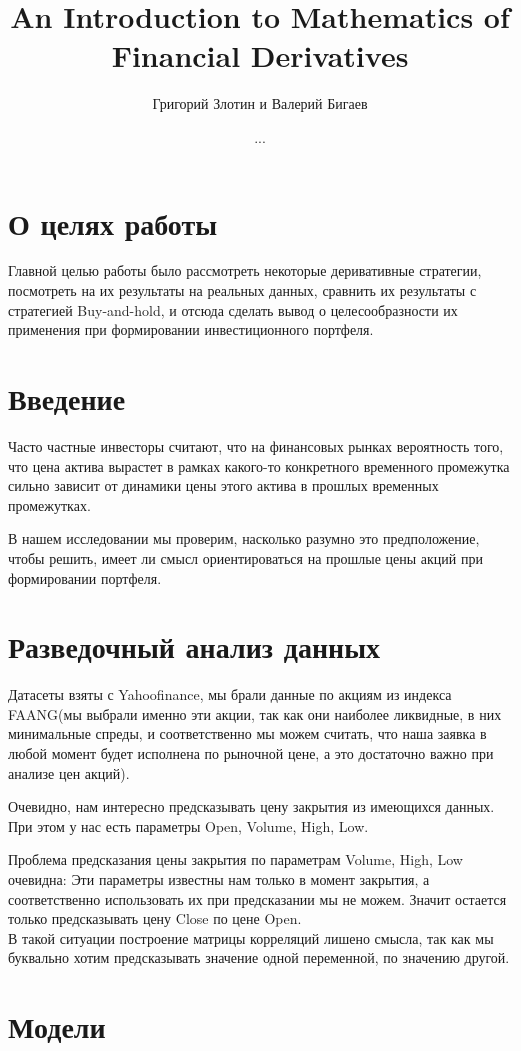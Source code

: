 \documentclass[12pt]{article}
\title{\textbf{An Introduction to Mathematics of Financial Derivatives}}
\author{Григорий Злотин и Валерий Бигаев}
\date{...}
\begin{document}
\section{О целях работы}{
Главной целью работы было рассмотреть некоторые деривативные стратегии, посмотреть на их результаты на реальных данных, сравнить их результаты с стратегией Buy-and-hold, и отсюда сделать вывод о целесообразности их применения при формировании инвестиционного портфеля. 
\section{Введение}
Часто частные инвесторы считают, что на финансовых рынках вероятность того, что цена актива вырастет в рамках какого-то конкретного временного промежутка сильно зависит от динамики цены этого актива в прошлых временных промежутках.\par В нашем исследовании мы проверим, насколько разумно это предположение, чтобы решить, имеет ли смысл ориентироваться на прошлые цены акций при формировании портфеля. \\
\section{Разведочный анализ данных}
Датасеты взяты с Yahoofinance, мы брали данные по акциям из индекса FAANG(мы выбрали именно эти акции, так как они наиболее ликвидные, в них минимальные спреды, и соответственно мы можем считать, что наша заявка в любой момент будет исполнена по рыночной цене, а это достаточно важно при анализе цен акций).\\ \par
Очевидно, нам интересно предсказывать цену закрытия из имеющихся данных. При этом у нас есть параметры Open, Volume, High, Low.\\ \par
Проблема предсказания цены закрытия по параметрам Volume, High, Low очевидна: Эти параметры известны нам только в момент закрытия, а соответственно использовать их при предсказании мы не можем. Значит остается только предсказывать цену Close по цене Open. \\
В такой ситуации построение матрицы корреляций лишено смысла, так как мы буквально хотим предсказывать значение одной переменной, по значению другой.
\section{Модели}
}
\end{document}
